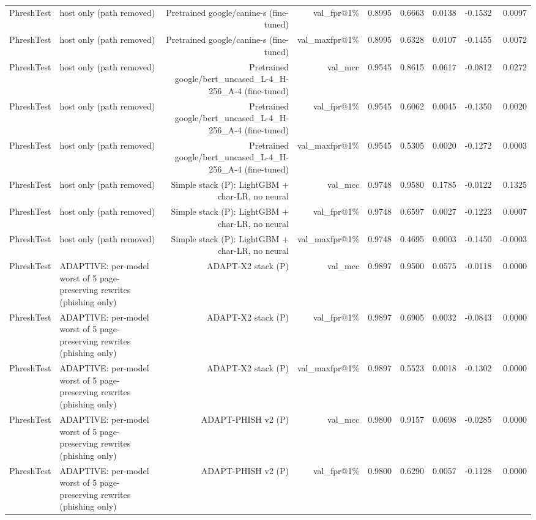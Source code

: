 \begin{table}[t]
\begin{tabular}{llrrrrrrr}
PhreshTest & host only (path removed) & Pretrained google/canine-s (fine-tuned) & val\_fpr@1\% & 0.8995 & 0.6663 & 0.0138 & -0.1532 & 0.0097 \\
PhreshTest & host only (path removed) & Pretrained google/canine-s (fine-tuned) & val\_maxfpr@1\% & 0.8995 & 0.6328 & 0.0107 & -0.1455 & 0.0072 \\
PhreshTest & host only (path removed) & Pretrained google/bert\_uncased\_L-4\_H-256\_A-4 (fine-tuned) & val\_mcc & 0.9545 & 0.8615 & 0.0617 & -0.0812 & 0.0272 \\
PhreshTest & host only (path removed) & Pretrained google/bert\_uncased\_L-4\_H-256\_A-4 (fine-tuned) & val\_fpr@1\% & 0.9545 & 0.6062 & 0.0045 & -0.1350 & 0.0020 \\
PhreshTest & host only (path removed) & Pretrained google/bert\_uncased\_L-4\_H-256\_A-4 (fine-tuned) & val\_maxfpr@1\% & 0.9545 & 0.5305 & 0.0020 & -0.1272 & 0.0003 \\
PhreshTest & host only (path removed) & Simple stack (P): LightGBM + char-LR, no neural & val\_mcc & 0.9748 & 0.9580 & 0.1785 & -0.0122 & 0.1325 \\
PhreshTest & host only (path removed) & Simple stack (P): LightGBM + char-LR, no neural & val\_fpr@1\% & 0.9748 & 0.6597 & 0.0027 & -0.1223 & 0.0007 \\
PhreshTest & host only (path removed) & Simple stack (P): LightGBM + char-LR, no neural & val\_maxfpr@1\% & 0.9748 & 0.4695 & 0.0003 & -0.1450 & -0.0003 \\
PhreshTest & ADAPTIVE: per-model worst of 5 page-preserving rewrites (phishing only) & ADAPT-X2 stack (P) & val\_mcc & 0.9897 & 0.9500 & 0.0575 & -0.0118 & 0.0000 \\
PhreshTest & ADAPTIVE: per-model worst of 5 page-preserving rewrites (phishing only) & ADAPT-X2 stack (P) & val\_fpr@1\% & 0.9897 & 0.6905 & 0.0032 & -0.0843 & 0.0000 \\
PhreshTest & ADAPTIVE: per-model worst of 5 page-preserving rewrites (phishing only) & ADAPT-X2 stack (P) & val\_maxfpr@1\% & 0.9897 & 0.5523 & 0.0018 & -0.1302 & 0.0000 \\
PhreshTest & ADAPTIVE: per-model worst of 5 page-preserving rewrites (phishing only) & ADAPT-PHISH v2 (P) & val\_mcc & 0.9800 & 0.9157 & 0.0698 & -0.0285 & 0.0000 \\
PhreshTest & ADAPTIVE: per-model worst of 5 page-preserving rewrites (phishing only) & ADAPT-PHISH v2 (P) & val\_fpr@1\% & 0.9800 & 0.6290 & 0.0057 & -0.1128 & 0.0000 \\

\end{tabular}
\end{table}
